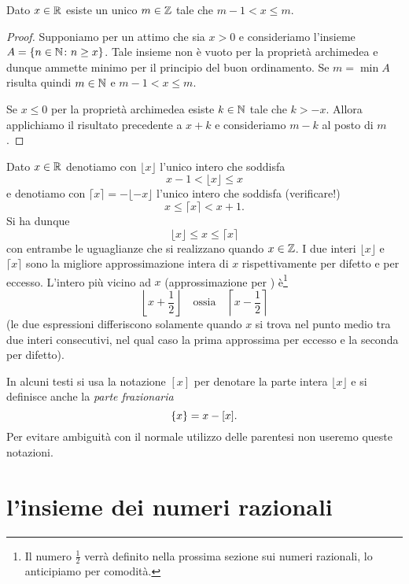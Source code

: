 \begin{theorem}
\mymark{*}%
  Dato $x\in \mathbb R$ esiste un unico $m\in \mathbb Z$ tale che $m-1 < x \le m$.
\end{theorem}
%
\begin{proof}
  Supponiamo per un attimo che sia $x > 0$
  e consideriamo l'insieme $A={\left\{ n \in \mathbb N \colon n\ge x \right\}}$.
  Tale insieme non è vuoto per la proprietà archimedea 
  e dunque ammette minimo per il principio del buon ordinamento.
  Se $m=\min A$ risulta quindi $m\in \mathbb N$ e $m-1< x \le m$.

  Se $x\le 0$ per la proprietà archimedea esiste $k\in \mathbb N$ tale che 
  $k>-x$. Allora applichiamo il risultato precedente a $x+k$ e consideriamo 
  $m-k$ al posto di $m$.
\end{proof}

\begin{definition}
  \mymark{**}%
  Dato $x\in \mathbb R$ denotiamo con $\lfloor x\rfloor$ l'unico intero
  che soddisfa
  \mynote{$\lfloor\cdot\rfloor$} %
  \[
    x - 1 < \lfloor x \rfloor \le x
  \]
  e denotiamo con $\lceil x \rceil = - \lfloor -x \rfloor$ l'unico intero che soddisfa (verificare!)
  \mynote{$\lceil\cdot\rceil$} %
  \[
    x \le \lceil x \rceil < x + 1.
  \]
  Si ha dunque
  \[
    \lfloor x \rfloor \le x \le \lceil x \rceil
  \]
  con entrambe le uguaglianze che si realizzano quando $x\in \mathbb Z$.
  I due interi $\lfloor x \rfloor$ e $\lceil x \rceil$
  sono la migliore approssimazione intera di $x$ rispettivamente
  per difetto e per eccesso.
  L'intero più vicino ad $x$ (approssimazione per )
  è\footnote{%
Il numero $\frac 1 2$ verrà definito nella prossima sezione sui numeri 
razionali, lo anticipiamo per comodità.}%
  \[
    \left\lfloor x + \frac 1 2 \right\rfloor
  \quad \text{ossia} \quad
    \left\lceil x-\frac 1 2 \right\rceil
  \]
  (le due espressioni differiscono solamente quando $x$ si trova nel punto medio tra 
  due interi consecutivi, nel qual caso la prima approssima per eccesso e la seconda 
  per difetto).
\end{definition}

In alcuni testi si usa la notazione $[x]$ per denotare la parte intera $\lfloor x \rfloor$ e si definisce
anche la \emph{parte frazionaria}
\[
  {\left\{ x \right\}} = x - [x].
\]
Per evitare ambiguità con il normale utilizzo delle parentesi
non useremo queste notazioni.
  
\section{l'insieme dei numeri razionali}


